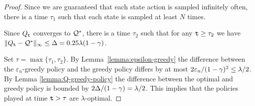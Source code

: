 \begin{advanced}
\begin{proof}
Since we are guaranteed that each state action is sampled infinitely
often, there is a time $\tau_1$ such that each state is sampled at
least $N$ times.

Since $Q_{\tt t}$ converges to $\mathcal{Q}^*$, there is a time $\tau_2$ such that for any ${\tt t}\geq \tau_2$ we have $\|Q_{\tt t}-\mathcal{Q}^*\|_\infty \leq \Delta=0.25\lambda (1-\gamma)$.

Set $\tau=\max\{\tau_1,\tau_2\}$. By
Lemma~\ref{lemma:epsilon-greedy} the difference between the
$\varepsilon_n$-greedy policy and the greedy policy differs by at most $2\varepsilon_n/(1-\gamma)^2\leq \lambda/2$. By Lemma
\ref{lemma:Q-greedy-policy} the difference between the optimal and
greedy policy is bounded by $2\Delta/(1-\gamma)=\lambda/2$. This
implies that the policies played at time ${\tt t}>\tau$ are
$\lambda$-optimal.
\end{proof}











\end{advanced}
